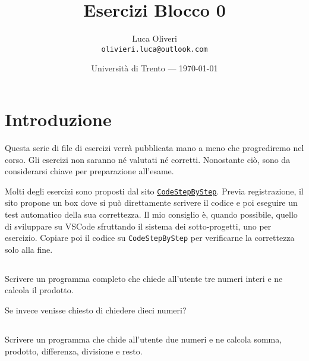 \documentclass{article}
\title{Esercizi Blocco 0} %
\author{Luca Oliveri\\ \texttt{olivieri.luca@outlook.com}} %
\date{Università di Trento --- \today} %
\begin{document}
\maketitle %


\section*{Introduzione} %
Questa serie di file di esercizi verrà pubblicata mano a meno che progrediremo nel corso. Gli esercizi non saranno né valutati né corretti. Nonostante ciò, sono da considerarsi chiave per preparazione all'esame.


\begin{info} 
	Molti degli esercizi sono proposti dal sito \href{https://www.codestepbystep.com/problem/list/cpp}{\texttt{CodeStepByStep}}. Previa registrazione, il sito propone un box dove si può direttamente scrivere il codice e poi eseguire un test automatico della sua correttezza. Il mio consiglio è, quando possibile, quello di sviluppare su VSCode sfruttando il sistema dei sotto-progetti, uno per esercizio. Copiare poi il codice su \texttt{CodeStepByStep} per verificarne la correttezza solo alla fine. 
\end{info}


\setcounter{section}{0}


\subsection{} 
Scrivere un programma completo che chiede all'utente tre numeri interi e ne calcola il prodotto. 

\begin{warn}[Occhio:]Se invece venisse chiesto di chiedere dieci numeri?
\end{warn}


\subsection{}
Scrivere un programma che chide all'utente due numeri e ne calcola somma, prodotto, differenza, divisione e resto.
\end{document}
